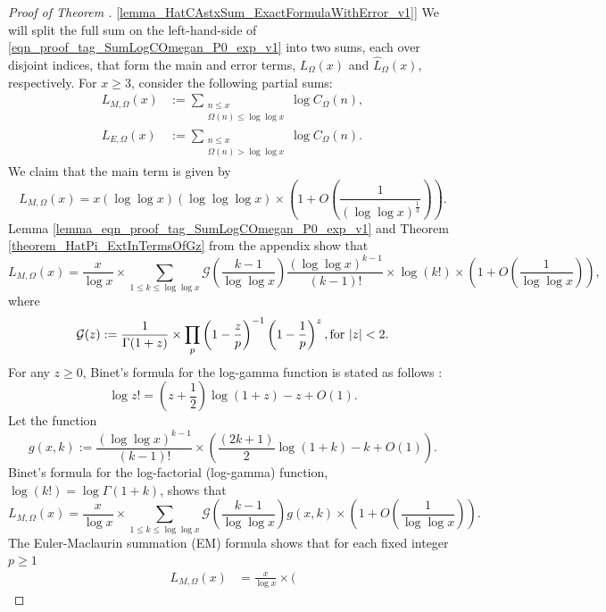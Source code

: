 \documentclass[11pt,reqno,a4letter]{article}
\newcommand{\hlocalref}[1]{\hyperref[#1]{\ref{#1}}}
\numberwithin{equation}{section}
\numberwithin{figure}{section}
\numberwithin{table}{section}
\newcommand{\seqnum}[1]{\href{http://oeis.org/#1}{\color{ProcessBlue}{\underline{#1}}}}
\theoremstyle{plain}
\numberwithin{theorem}{section}
\theoremstyle{definition}
\theoremstyle{remark}
\newcommand{\mathtext}[1]{\text{\rm #1}}
\begin{document}
\begin{proof}[Proof of Theorem \hlocalref{lemma_HatCAstxSum_ExactFormulaWithError_v1}]  
We will split the full sum on the left-hand-side of 
\eqref{eqn_proof_tag_SumLogCOmegan_P0_exp_v1} into two sums, 
each over disjoint indices, that form the main and error terms, 
$L_{\Omega}(x)$ and $\widehat{L}_{\Omega}(x)$, respectively.
For $x \geq 3$, consider the following partial sums:
\begin{align*}
L_{M,\Omega}(x) & := 
	\sum_{\substack{n \leq x \\ \Omega(n) \leq \log\log x}} \log C_{\Omega}(n), \\ 
L_{E,\Omega}(x) & := 
	\sum_{\substack{n \leq x \\ \Omega(n) >\log\log x}} 
	\log C_{\Omega}(n).
\end{align*}
We claim that the main term is given by 
\begin{equation}
\label{eqn_proof_tag_LOmegax_MainTerm_v1}
L_{M,\Omega}(x) = 
	x (\log\log x)(\log\log\log x) \times \left(1 + 
     O\left(\frac{1}{(\log\log x)^{\frac{1}{3}}}\right)\right).
\end{equation}
Lemma \hlocalref{lemma_eqn_proof_tag_SumLogCOmegan_P0_exp_v1} and 
Theorem \hlocalref{theorem_HatPi_ExtInTermsOfGz} from the appendix show that 
\[
L_{M,\Omega}(x) = \frac{x}{\log x} \times \sum_{1 \leq k \leq \log\log x} 
	\mathcal{G}\left(\frac{k-1}{\log\log x}\right) \frac{(\log\log x)^{k-1}}{(k-1)!} \times 
	\log(k!) \times \left(1 + O\left(\frac{1}{\log\log x}\right)\right), 
\]
where 
\[
\mathcal{G}(z) := \frac{1}{\Gamma(1+z)} \times \prod_p \left(1 - \frac{z}{p}\right)^{-1} \left( 
	1 - \frac{1}{p}\right)^z, 
	\mathtext{ for } |z| < 2. 
\]
For any $z \geq 0$, 
Binet's formula for the log-gamma function is stated as follows 
\cite[\S 5.9(i)]{NISTHB}: 
\[
\log z! = \left(z+\frac{1}{2}\right)\log(1+z) - z + O(1). 
\]
Let the function 
$$g(x, k) := \frac{(\log\log x)^{k-1}}{(k-1)!} \times \left(\frac{(2k+1)}{2} \log(1+k)-k + O(1)\right).$$ 
Binet's formula for the log-factorial (log-gamma) function, $\log(k!) = \log\Gamma(1 + k)$, shows that 
\[
L_{M,\Omega}(x) = \frac{x}{\log x} \times \sum_{1 \leq k \leq \log\log x} 
	\mathcal{G}\left(\frac{k-1}{\log\log x}\right) g(x, k) \times 
	\left(1 + O\left(\frac{1}{\log\log x}\right)\right). 
\]
The Euler-Maclaurin summation (EM) formula \cite[\S 9.5]{GKP} shows that 
for each fixed integer $p \geq 1$ 
\cite[\seqnum{A000367}; \seqnum{A002445}]{OEIS} 
\begin{align*}
L_{M,\Omega}(x) & = \frac{x}{\log x} \times \Biggl(

\end{align*}
\end{proof}
\end{document}
